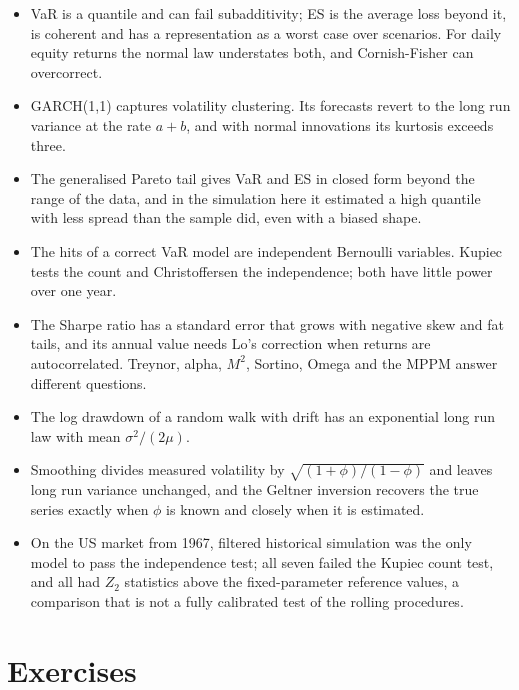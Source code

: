 \begin{chapterrefs}
\begin{itemize}
  \item VaR is a quantile and can fail subadditivity; ES is the average loss beyond it, is coherent
        and has a representation as a worst case over scenarios. For daily equity returns the normal
        law understates both, and Cornish-Fisher can overcorrect.
  \item GARCH(1,1) captures volatility clustering. Its forecasts revert to the long run variance
        at the rate $a+b$, and with normal innovations its kurtosis exceeds three.
  \item The generalised Pareto tail gives VaR and ES in closed form beyond the range of the data, and in
        the simulation here it estimated a high quantile with less spread than the sample did, even with
        a biased shape.
  \item The hits of a correct VaR model are independent Bernoulli variables. Kupiec tests the count
        and Christoffersen the independence; both have little power over one year.
  \item The Sharpe ratio has a standard error that grows with negative skew and fat tails, and its
        annual value needs Lo's correction when returns are autocorrelated. Treynor, alpha, $M^2$,
        Sortino, Omega and the MPPM answer different questions.
  \item The log drawdown of a random walk with drift has an exponential long run law with mean
        $\sigma^2/(2\mu)$.
  \item Smoothing divides measured volatility by $\sqrt{(1+\phi)/(1-\phi)}$ and leaves long run variance
        unchanged, and the Geltner inversion recovers the true series exactly when $\phi$ is known and
        closely when it is estimated.
  \item On the US market from 1967, filtered historical simulation was the only model to pass the
        independence test; all seven failed the Kupiec count test, and all had $Z_2$ statistics above the
        fixed-parameter reference values, a comparison that is not a fully calibrated test of the
        rolling procedures.
\end{itemize}

\FloatBarrier
\section{Exercises}
\label{sec8:exercises}


\end{chapterrefs}
